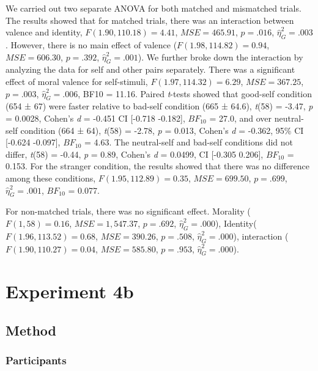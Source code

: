 \documentclass[
  english,
  man]{apa6}
\begin{document}
We carried out two separate ANOVA for both matched and mismatched trials. The results showed that for matched trials, there was an interaction between valence and identity, \(F(1.90, 110.18) = 4.41\), \(\mathit{MSE} = 465.91\), \(p = .016\), \(\hat{\eta}^2_G = .003\). However, there is no main effect of valence (\(F(1.98, 114.82) = 0.94\), \(\mathit{MSE} = 606.30\), \(p = .392\), \(\hat{\eta}^2_G = .001\)). We further broke down the interaction by analyzing the data for self and other pairs separately. There was a significant effect of moral valence for self-stimuli, \(F(1.97, 114.32) = 6.29\), \(\mathit{MSE} = 367.25\), \(p = .003\), \(\hat{\eta}^2_G = .006\), BF10 = 11.16. Paired \emph{t}-tests showed that good-self condition (654 ± 67) were faster relative to bad-self condition (665 ± 64.6), \emph{t}(58) = -3.47, \emph{p} = 0.0028, Cohen's \emph{d} = -0.451 CI {[}-0.718 -0.182{]}, \(BF_{10}\) = 27.0, and over neutral-self condition (664 ± 64), \emph{t}(58) = -2.78, \emph{p} = 0.013, Cohen's \emph{d} = -0.362, 95\% CI {[}-0.624 -0.097{]}, \(BF_{10}\) = 4.63. The neutral-self and bad-self conditions did not differ, \emph{t}(58) = -0.44, \emph{p} = 0.89, Cohen's \emph{d} = 0.0499, CI {[}-0.305 0.206{]}, \(BF_{10}\) = 0.153. For the stranger condition, the results showed that there was no difference among these conditions, \(F(1.95, 112.89) = 0.35\), \(\mathit{MSE} = 699.50\), \(p = .699\), \(\hat{\eta}^2_G = .001\), \(BF_{10}\) = 0.077.

For non-matched trials, there was no significant effect. Morality (\(F(1, 58) = 0.16\), \(\mathit{MSE} = 1,547.37\), \(p = .692\), \(\hat{\eta}^2_G = .000\)), Identity(\(F(1.96, 113.52) = 0.68\), \(\mathit{MSE} = 390.26\), \(p = .508\), \(\hat{\eta}^2_G = .000\)), interaction (\(F(1.90, 110.27) = 0.04\), \(\mathit{MSE} = 585.80\), \(p = .953\), \(\hat{\eta}^2_G = .000\)).

\hypertarget{experiment-4b}{%
\section{Experiment 4b}\label{experiment-4b}}

\hypertarget{method-5}{%
\subsection{Method}\label{method-5}}

\hypertarget{participants-7}{%
\subsubsection{Participants}\label{participants-7}}
\end{document}
